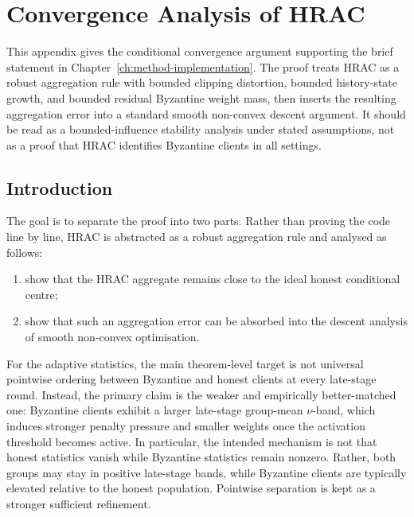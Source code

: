 \doublespacing %

\chapter{Convergence Analysis of HRAC}
\label{app:convergence-analysis}

\thesisspacing %

This appendix gives the conditional convergence argument supporting the brief
statement in Chapter~\ref{ch:method-implementation}. The proof treats HRAC as a
robust aggregation rule with bounded clipping distortion, bounded history-state
growth, and bounded residual Byzantine weight mass, then inserts the resulting
aggregation error into a standard smooth non-convex descent argument. It should
be read as a bounded-influence stability analysis under stated assumptions, not
as a proof that HRAC identifies Byzantine clients in all settings.
\section{Introduction}

The goal is to separate the proof into two parts. Rather than proving the code
line by line, HRAC is abstracted as a robust aggregation rule and analysed as
follows:

\begin{enumerate}[label=\arabic*.]
    \item show that the HRAC aggregate remains close to the ideal honest
    conditional centre;
    \item show that such an aggregation error can be absorbed into the descent
    analysis of smooth non-convex optimisation.
\end{enumerate}

For the adaptive statistics, the main theorem-level target is not universal
pointwise ordering between Byzantine and honest clients at every late-stage
round. Instead, the primary claim is the weaker and empirically better-matched
one: Byzantine clients exhibit a larger late-stage group-mean \(\nu\)-band,
which induces stronger penalty pressure and smaller weights once the activation
threshold becomes active. In particular, the intended mechanism is not that
honest statistics vanish while Byzantine statistics remain nonzero. Rather,
both groups may stay in positive late-stage bands, while Byzantine clients are
typically elevated relative to the honest population. Pointwise separation is
kept as a stronger sufficient refinement.

